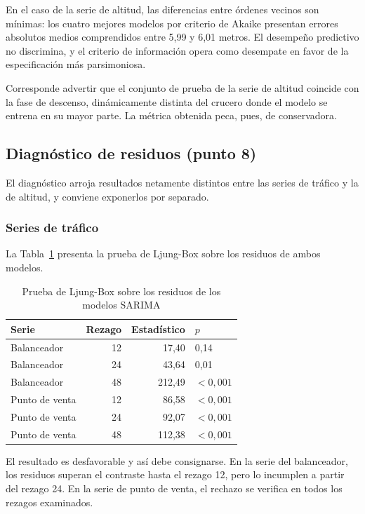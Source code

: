 En el caso de la serie de altitud, las diferencias entre órdenes vecinos son mínimas: los
cuatro mejores modelos por criterio de Akaike presentan errores absolutos medios comprendidos
entre 5,99 y 6,01 metros. El desempeño predictivo no discrimina, y el criterio de información
opera como desempate en favor de la especificación más parsimoniosa.

Corresponde advertir que el conjunto de prueba de la serie de altitud coincide con la fase de
descenso, dinámicamente distinta del crucero donde el modelo se entrena en su mayor parte. La métrica obtenida peca, pues, de conservadora.

\subsection{Diagnóstico de residuos (punto 8)}

El diagnóstico arroja resultados netamente distintos entre las series de tráfico y la de
altitud, y conviene exponerlos por separado.

\subsubsection{Series de tráfico}

La Tabla~\ref{tab:ljung_trafico} presenta la prueba de Ljung-Box sobre los residuos de ambos
modelos.

\begin{table}[htbp]
\centering
\caption{Prueba de Ljung-Box sobre los residuos de los modelos SARIMA}
\label{tab:ljung_trafico}
\small
\begin{tabular}{lrrl}
\toprule
\textbf{Serie} & \textbf{Rezago} & \textbf{Estadístico} & \textbf{$p$} \\
\midrule
Balanceador & 12 & 17,40 & 0,14 \\
Balanceador & 24 & 43,64 & 0,01 \\
Balanceador & 48 & 212,49 & $<0{,}001$ \\
\addlinespace
Punto de venta & 12 & 86,58 & $<0{,}001$ \\
Punto de venta & 24 & 92,07 & $<0{,}001$ \\
Punto de venta & 48 & 112,38 & $<0{,}001$ \\
\bottomrule
\end{tabular}
\end{table}

El resultado es desfavorable y así debe consignarse. En la serie del balanceador, los
residuos superan el contraste hasta el rezago 12, pero lo incumplen a partir del rezago 24. En
la serie de punto de venta, el rechazo se verifica en todos los rezagos examinados.

